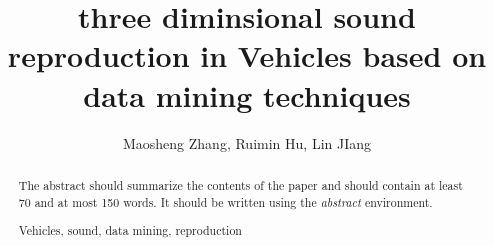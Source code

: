 \documentclass[runningheads,a4paper]{llncs}
\newcommand{\keywords}[1]{\par\addvspace\baselineskip
\noindent\keywordname\enspace\ignorespaces#1}
\begin{document}
\mainmatter  %

\title{ three diminsional sound reproduction in Vehicles based on data mining techniques }

%
%
\author{Maosheng Zhang, Ruimin Hu, Lin JIang}
%
%

\maketitle

\begin{abstract}
The abstract should summarize the contents of the paper and should
contain at least 70 and at most 150 words. It should be written using the
\emph{abstract} environment.
\keywords{Vehicles, sound, data mining, reproduction}
\end{abstract}
\end{document}
